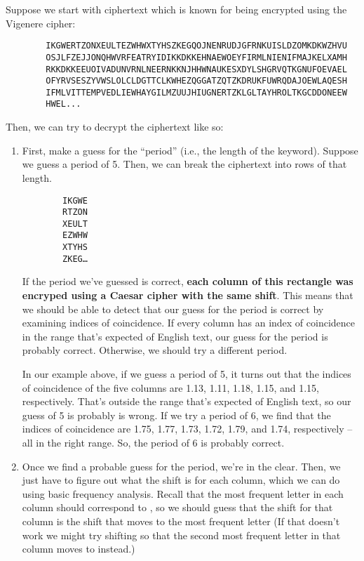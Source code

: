 \documentclass[letterpaper]{article}
\begin{document}
\bigskip 

Suppose we start with ciphertext which is known for being encrypted using the Vigenere cipher:
\begin{mdframed}
    \begin{verbatim}
        IKGWERTZONXEULTEZWHWXTYHSZKEGQOJNENRUDJGFRNKUISLDZOMKDKWZHVU
        OSJLFZEJJONQHWVRFEATRYIDIKKDKKEHNAEWOEYFIRMLNIENIFMAJKELXAMH
        RKKDKKEEUOIVADUNVRNLNEERNKKNJHHWNAUKESXDYLSHGRVQTKGNUFOEVAEL
        OFYRVSESZYVWSLOLCLDGTTCLKWHEZQGGATZQTZKDRUKFUWRQDAJOEWLAQESH
        IFMLVITTEMPVEDLIEWHAYGILMZUUJHIUGNERTZKLGLTAYHROLTKGCDDONEEW
        HWEL...\end{verbatim}
\end{mdframed}
Then, we can try to decrypt the ciphertext like so: 
\begin{enumerate}
    \item First, make a guess for the ``period'' (i.e., the length of the keyword). Suppose we guess a period of 5. Then, we can break the ciphertext into rows of that length. 
    \begin{verbatim}
        IKGWE 
        RTZON 
        XEULT 
        EZWHW 
        XTYHS 
        ZKEG…\end{verbatim}

    If the period we've guessed is correct, \textbf{each column of this rectangle was encryped using a Caesar cipher with the same shift}. This means that we should be able to detect that our guess for the period is correct by examining indices of coincidence. If every column has an index of coincidence in the range that's expected of English text, our guess for the period is probably correct. Otherwise, we should try a different period. 

    \bigskip 

    In our example above, if we guess a period of 5, it turns out that the indices of coincidence of the five columns are 1.13, 1.11, 1.18, 1.15, and 1.15, respectively. That's outside the range that's expected of English text, so our guess of 5 is probably is wrong. If we try a period of 6, we find that the indices of coincidence are 1.75, 1.77, 1.73, 1.72, 1.79, and 1.74, respectively -- all in the right range. So, the period of 6 is probably correct. 

    \item Once we find a probable guess for the period, we're in the clear. Then, we just have to figure out what the shift is for each column, which we can do using basic frequency analysis. Recall that the most frequent letter in each column should correspond to , so we should guess that the shift for that column is the shift that moves  to the most frequent letter (If that doesn't work we might try shifting so that the second most frequent letter in that column moves to  instead.)
\end{enumerate}
\end{document}
